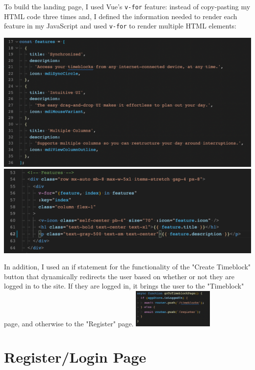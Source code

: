\documentclass[notitlepage, 12pt]{report}
\newcommand{\code}[1]{\texttt{#1}}
\begin{document}
To build the landing page, I used Vue's \code{v-for} feature: instead of copy-pasting my HTML code three times and, I defined the information needed to render each feature in my JavaScript and used \code{v-for} to render multiple HTML elements:

\includegraphics[width=\textwidth]{landing-page-features.png}
\includegraphics[width=\textwidth]{landing-page-v-for.png}

In addition, I used an if statement for the functionality of the "Create Timeblock" button that dynamically redirects the user based on whether or not they are logged in to the site. If they are logged in, it brings the user to the "Timeblock" page, and otherwise to the "Register" page.
\includegraphics[width=0.3\textwidth]{landing-page-go-to-timeblock-page.png}

\section*{Register/Login Page}
\end{document}
